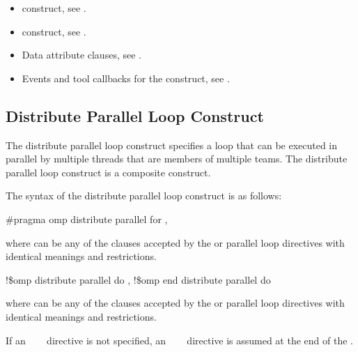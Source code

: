 \crossreferences
\begin{itemize}
\item {} construct, see 
.

\item {} construct, see 
.

\item Data attribute clauses, see 
.

\item Events and tool callbacks for the  construct, see
.

\end{itemize}









\subsection{Distribute Parallel Loop Construct}
\label{subsec:Distribute Parallel Loop Construct}
\summary
The distribute parallel loop construct specifies a loop that can be executed in parallel by 
multiple threads that are members of multiple teams. The distribute parallel loop construct is a composite construct.

\syntax
The syntax of the distribute parallel loop construct is as follows:

\begin{ccppspecific}
\begin{boxedcode}
\#pragma omp distribute parallel for \plc{[clause[ [},\plc{] clause] ... ] newline}
\end{boxedcode}

where  can be any of the clauses accepted by the  or parallel loop 
directives with identical meanings and restrictions.
\end{ccppspecific}

\begin{fortranspecific}
\begin{boxedcode}
!\$omp distribute parallel do \plc{[clause[ [},\plc{] clause] ... ]}
\plc{[}!\$omp end distribute parallel do\plc{]}
\end{boxedcode}

where  can be any of the clauses accepted by the  or parallel loop 
directives with identical meanings and restrictions.

If an ~~~ directive is not specified, an 
~~~ directive is assumed at the end of the .
\end{fortranspecific}

